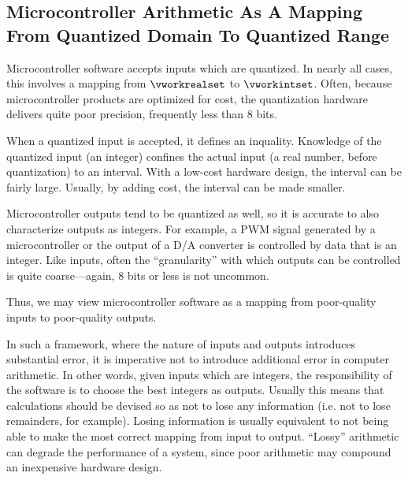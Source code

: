 \subsection{Microcontroller Arithmetic As A Mapping From Quantized Domain To
            Quantized Range}
\label{ccil0:sppm0:smam0}

Microcontroller software accepts inputs which are quantized.  In nearly all cases,
this involves a mapping from $\vworkrealset$ to $\vworkintset$.  Often, because
microcontroller products are optimized for cost, the quantization hardware
delivers quite poor precision, frequently less than 8 bits.  

When a quantized input is accepted, it defines an inquality.  Knowledge of
the quantized input (an integer) confines the actual input (a real
number, before 
quantization) to an interval.  With a low-cost hardware design, the
interval can be fairly large.  Usually, by adding cost, the
interval can be made smaller.

Microcontroller outputs tend to be quantized as well, so it is
accurate to also characterize outputs as integers.  For example, a PWM signal
generated by a microcontroller or the output of a D/A converter is
controlled by data that is an integer.  Like inputs, often the ``granularity''
with which outputs can be controlled is quite coarse---again, 8 bits or
less is not uncommon.

Thus, we may view microcontroller software as a mapping from poor-quality
inputs to poor-quality outputs.

In such a framework, where the nature of inputs and outputs introduces
substantial error, it is imperative not to introduce additional error
in computer arithmetic.  In other words, given inputs which are 
integers, the responsibility of the software is to choose the best 
integers as outputs.  Usually this means that calculations should be
devised so as not to lose any information (i.e.
not to lose remainders, for example).  Losing information is usually
equivalent to not being able to make the most correct mapping from input
to output.  ``Lossy'' arithmetic can degrade the performance of a system,
since poor arithmetic may compound an inexpensive hardware design.


